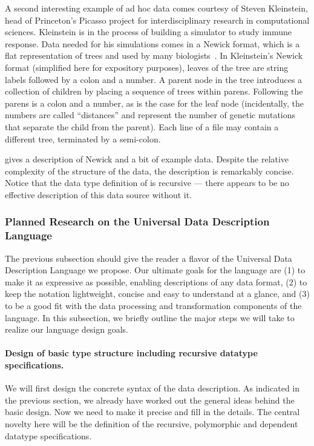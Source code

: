 \documentclass[11pt]{article}
\begin{document}
A second interesting example of ad hoc data comes courtesy of
Steven Kleinstein, head of Princeton's Picasso project for
interdisciplinary research in computational sciences.  
Kleinstein is in the process of 
building a simulator to study immune response.  Data
needed for his simulations comes in a Newick format, which is
a flat representation of trees and used by many biologists~\cite{newick}.  
In Kleinstein's Newick format (simplified
here for expository purposes), leaves of the
tree are string labels followed by a colon and a number.
A parent node in the tree introduces a collection of
children by placing a sequence of trees within parens.
Following the parens is a colon and a number, as is the case
for the leaf node (incidentally, the numbers are called ``distances''
and represent the number of genetic mutations that separate the
child from the parent).  Each line of a file may contain
a different tree, terminated by a semi-colon.

 gives a description of Newick
and a bit of example data.
Despite the relative complexity of the structure of the data, 
the description is remarkably concise.
Notice that the data type definition of  is recursive ---
there appears to be no effective description of this data
source without it.  

\subsubsection{Planned Research on the Universal Data Description Language}

The previous subsection should give the reader a flavor of the
Universal Data Description Language we propose.
Our ultimate goals for the language are (1) to make it
as expressive as possible, enabling descriptions of
any data format, (2) to keep the notation lightweight, 
concise and easy to understand at a glance, and (3)
to be a good fit with the data processing and
transformation components of the \datatype{} language.
In this subsection, we briefly outline the major steps
we will take to realize our language design goals.

\paragraph*{Design of basic type structure including recursive datatype specifications.}
We will first design the concrete syntax of the data description.
As indicated in the previous section, we already have worked
out the general ideas behind the basic design.  Now we need to make 
it precise and fill in the details.  The central novelty
here will be the definition of the recursive, polymorphic
and dependent datatype specifications.
\end{document}
